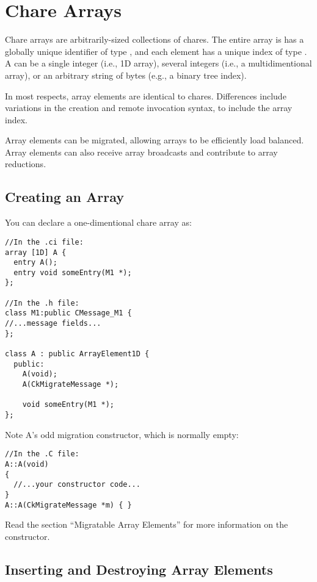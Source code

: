 \section{Chare Arrays}

Chare arrays  are arbitrarily-sized collections of chares.
The entire array is has a globally unique identifier of type 
, and each element has a unique index of type
.  A  can be a single integer (i.e., 1D
array), several integers (i.e., a multidimentional array), or 
an arbitrary string of bytes (e.g., a binary tree index).

In most respects, array elements are identical to chares.  Differences
include variations in the creation and remote invocation syntax, to
include the array index.  

Array elements can be migrated, allowing arrays to be efficiently
load balanced.  Array elements can also receive array broadcasts and
contribute to array reductions.

\subsection{Creating an Array}

You can declare a one-dimentional chare array
as:

\begin{verbatim}
//In the .ci file:
array [1D] A {
  entry A();
  entry void someEntry(M1 *);
};

//In the .h file:
class M1:public CMessage_M1 {
//...message fields...
};

class A : public ArrayElement1D {
  public:
    A(void);
    A(CkMigrateMessage *);

    void someEntry(M1 *);
};
\end{verbatim}

Note A's odd migration constructor, which is normally empty:

\begin{verbatim}
//In the .C file:
A::A(void)
{
  //...your constructor code...
}
A::A(CkMigrateMessage *m) { }
\end{verbatim}

Read the section ``Migratable Array Elements'' for more
information on the 
constructor. 


\subsection{Inserting and Destroying Array Elements}

